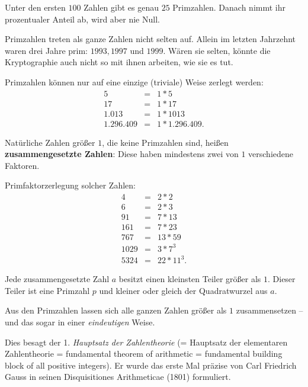\begin{refsegment}
Unter den ersten $100$ Zahlen gibt es genau $25$ Primzahlen. Danach nimmt ihr
prozentualer Anteil ab, wird aber nie Null.

Primzahlen treten als ganze Zahlen nicht selten auf. Allein im letzten
Jahrzehnt waren drei Jahre prim: $1993, 1997$ und $1999$. Wären sie selten,
könnte die Kryptographie auch nicht so mit ihnen arbeiten, wie sie es tut.

Primzahlen können nur auf eine einzige (\glqq triviale\grqq) Weise zerlegt werden:
\begin{eqnarray*}
5 & = & 1 * 5 \nonumber\\
17 & =  & 1 * 17 \nonumber\\
1.013 &  = & 1 * 1013 \nonumber\\
1.296.409 & = & 1 * 1.296.409. \nonumber
\end{eqnarray*}

\begin{definition}\label{def-zth-composite}
Natürliche Zahlen größer $1$, die keine Primzahlen sind, heißen
\textbf{zusammengesetzte Zahlen}: Diese haben mindestens zwei von $1$ verschiedene
Faktoren.
\end{definition}


\begin{example}{ Primfaktorzerlegung solcher Zahlen:}
\begin{eqnarray*}
4 & = & 2*2  \nonumber\\
6 & = & 2*3  \nonumber\\
91 & = & 7*13  \nonumber\\
161 & = & 7*23  \nonumber\\
767 & = & 13*59  \nonumber\\
1029 & = & 3 * 7^3  \nonumber\\
5324 & = & 22 * 11^3.  \nonumber
\end{eqnarray*}

\begin{satz}\label{thm-zth-cnum}
Jede zusammengesetzte Zahl $a$ besitzt einen kleinsten Teiler größer
als $1$. Dieser Teiler ist eine Primzahl $p$ und kleiner oder gleich der Quadratwurzel
aus $a$.
\end{satz}
\end{example}
Aus den Primzahlen lassen sich alle ganzen Zahlen größer als $1$
zusammensetzen -- und das sogar in einer {\em eindeutigen} Weise.

Dies besagt  der 1. {\em Hauptsatz der Zahlentheorie} (= Hauptsatz der elementaren
Zahlentheorie = fundamental theorem of arithmetic = fundamental building
block of all positive integers). Er wurde das erste Mal präzise von Carl
Friedrich Gauss in seinen Disquisitiones Arithmeticae (1801) formuliert.
  


\end{refsegment}
